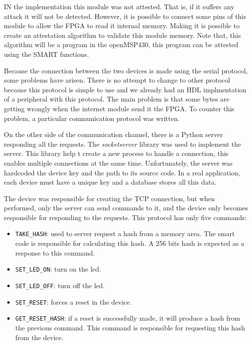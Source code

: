 IN the implementation this module was not attested. That is, if it suffers any attack it will not be detected. However, it is possible to connect some pins of this module to allow the FPGA to read it internal memory. Making it is possible to create an attestation algorithm to validate this module memory. Note that, this algorithm will be a program in the openMSP430, this program can be attested using the SMART functions.

Because the connection between the two devices is made using the serial protocol, some problems have arisen. There is no attempt to change to other protocol because this protocol is simple to use and we already had an HDL implmentation of a peripheral with this protocol.  The main problem is that some bytes are getting wrongly when the internet module send it the FPGA. To counter this problem, a particular communication protocol was written. 

On the other side of the communication channel, there is a Python server responding all the requests. The \textit{socketserver} library was used to implement the server. This library help t create a new process to handle a connection, this enables multiple connections at the same time. Unfortunately, the server was hardcoded the device key and the path to its source code. In a real application, each device must have a unique key and a database stores all this data. 

The device was responsible for creating the TCP connection, but when performed, only the server can send commands to it, and the device only becomes responsible for responding to the requests. This protocol has only five commands: 

\begin{itemize}
	\item \verb|TAKE_HASH|: used to server request a hash from a memory area. The smart code is responsible for calculating this hash. A 256 bits hash is expected as a response to this command.
	\item \verb|SET_LED_ON|: turn on the led. 
	\item \verb|SET_LED_OFF|: turn off the led. 
	\item \verb|SET_RESET|: forces a reset in the device. 
	\item \verb|GET_RESET_HASH|: if a reset is successfully made, it will produce a hash from the previous command. This command is responsible for requesting this hash from the device. 
\end{itemize}

